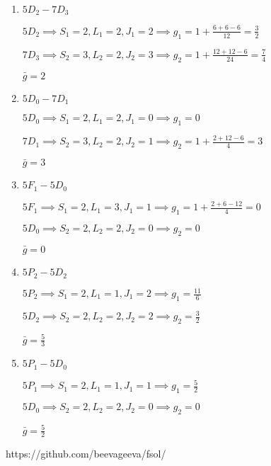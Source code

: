 \documentclass[10pt]{book}
\begin{document}
\begin{enumerate}
\item $5D_2 - 7D_3$

$5D_2 \implies S_1 = 2, L_1 = 2, J_1 = 2 \implies g_1 = 1 + \frac{6+6-6}{12} = \frac{3}{2}$

$7D_3 \implies S_2 = 3, L_2 = 2, J_2 = 3 \implies g_2 = 1 + \frac{12+12-6}{24} = \frac{7}{4}$

$\bar{g} = 2$

\item $5D_0 - 7D_1$

$5D_0 \implies S_1 = 2, L_1 = 2, J_1 = 0 \implies g_1 = 0$

$7D_1 \implies S_2 = 3, L_2 = 2, J_2 = 1 \implies g_2 = 1 + \frac{2+12-6}{4} = 3$

$\bar{g} = 3$

\item $5F_1 - 5D_0$

$5F_1 \implies S_1 = 2, L_1 = 3, J_1 = 1 \implies g_1 = 1 + \frac{2+6-12}{4} = 0$

$5D_0 \implies S_2 = 2, L_2 = 2, J_2 = 0 \implies g_2 = 0$

$\bar{g} = 0$

\item $5P_2 - 5D_2$

$5P_2 \implies S_1 = 2, L_1 = 1, J_1 = 2 \implies g_1 =  \frac{11}{6}$

$5D_2 \implies S_2 = 2, L_2 = 2, J_2 = 2 \implies g_2 = \frac{3}{2}$

$\bar{g} = \frac{5}{3}$

\item $5P_1 - 5D_0$

$5P_1 \implies S_1 = 2, L_1 = 1, J_1 = 1 \implies g_1 = \frac{5}{2}$

$5D_0 \implies S_2 = 2, L_2 = 2, J_2 = 0 \implies g_2 = 0$

$\bar{g} = \frac{5}{2}$

\end{enumerate}

 
https://github.com/beevageeva/fsol/
\end{document}
